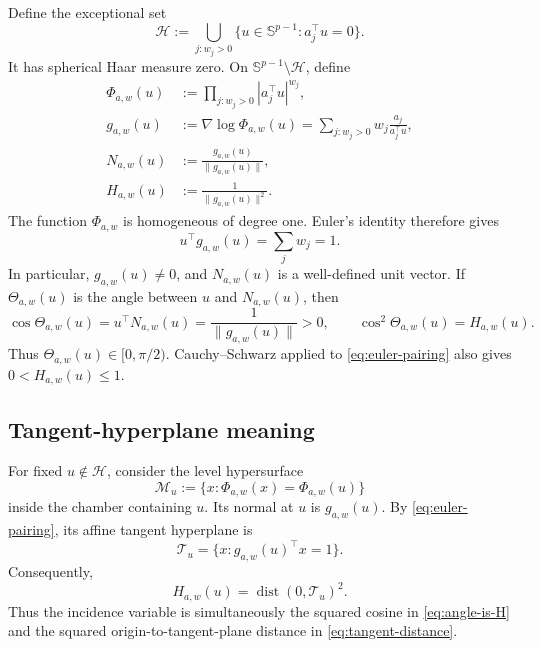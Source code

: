 \documentclass[11pt]{article}
\numberwithin{equation}{section}
\theoremstyle{thmstyleone}%
\theoremstyle{thmstyletwo}%
\let\cref\autoref
\newcommand{\sphere}{\mathbb S}
\newcommand{\dist}{\operatorname{dist}}
\begin{document}
Define the exceptional set
\begin{equation}
  \mathcal H
  :=\bigcup_{j:w_j>0}
  \{u\in\sphere^{p-1}:a_j^\top u=0\}.
  \label{eq:exceptional-hyperplanes}
\end{equation}
It has spherical Haar measure zero.  On
\(\sphere^{p-1}\setminus\mathcal H\), define
\begin{align}
  \Phi_{a,w}(u)
  &:=\prod_{j:w_j>0}|a_j^\top u|^{w_j},
  \label{eq:master-function}\\
  g_{a,w}(u)
  &:=\nabla\log\Phi_{a,w}(u)
    =\sum_{j:w_j>0}w_j\frac{a_j}{a_j^\top u},
  \label{eq:log-gradient}\\
  N_{a,w}(u)
  &:=\frac{g_{a,w}(u)}{\|g_{a,w}(u)\|},
  \label{eq:unit-normal}\\
  H_{a,w}(u)
  &:=\frac{1}{\|g_{a,w}(u)\|^2}.
  \label{eq:incidence-functional}
\end{align}
The function \(\Phi_{a,w}\) is homogeneous of degree one.  Euler's identity
therefore gives
\begin{equation}
  u^\top g_{a,w}(u)=\sum_jw_j=1.
  \label{eq:euler-pairing}
\end{equation}
In particular, \(g_{a,w}(u)\neq0\), and \(N_{a,w}(u)\) is a well-defined
unit vector.  If \(\Theta_{a,w}(u)\) is the angle between \(u\) and
\(N_{a,w}(u)\), then
\begin{equation}
  \cos\Theta_{a,w}(u)
  =u^\top N_{a,w}(u)
  =\frac{1}{\|g_{a,w}(u)\|}>0,
  \qquad
  \cos^2\Theta_{a,w}(u)=H_{a,w}(u).
  \label{eq:angle-is-H}
\end{equation}
Thus \(\Theta_{a,w}(u)\in[0,\pi/2)\).  Cauchy--Schwarz applied to
\cref{eq:euler-pairing} also gives \(0<H_{a,w}(u)\leq1\).

\subsection{Tangent-hyperplane meaning}

For fixed \(u\notin\mathcal H\), consider the level hypersurface
\begin{equation}
  \mathcal M_u
  :=\{x:\Phi_{a,w}(x)=\Phi_{a,w}(u)\}
  \label{eq:level-surface}
\end{equation}
inside the chamber containing \(u\).  Its normal at \(u\) is
\(g_{a,w}(u)\).  By \cref{eq:euler-pairing}, its affine tangent hyperplane is
\begin{equation}
  \mathcal T_u
  =\{x:g_{a,w}(u)^\top x=1\}.
  \label{eq:tangent-hyperplane}
\end{equation}
Consequently,
\begin{equation}
  H_{a,w}(u)
  =\dist(0,\mathcal T_u)^2.
  \label{eq:tangent-distance}
\end{equation}
Thus the incidence variable is simultaneously the squared cosine in
\cref{eq:angle-is-H} and the squared origin-to-tangent-plane distance in
\cref{eq:tangent-distance}.
\end{document}
